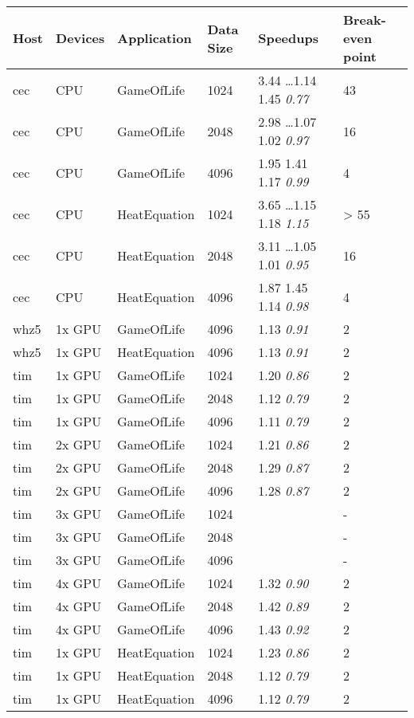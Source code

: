 \begin{tabular}{| l | l | l | l | l | l |}
\hline
\textbf{Host} & \textbf{Devices} & \textbf{Application} & \textbf{Data Size} & \textbf{Speedups} & \textbf{Break-even point}\\
\hline
cec & CPU & GameOfLife & 1024 & 3.44 \ldots 1.14 1.45 \textit{0.77} & 43 \\
cec & CPU & GameOfLife & 2048 & 2.98 \ldots 1.07 1.02 \textit{0.97} & 16 \\
cec & CPU & GameOfLife & 4096 & 1.95 1.41 1.17 \textit{0.99} & 4 \\
cec & CPU & HeatEquation & 1024 & 3.65 \ldots 1.15 1.18 \textit{1.15} & > 55 \\
cec & CPU & HeatEquation & 2048 & 3.11 \ldots 1.05 1.01 \textit{0.95} & 16 \\
cec & CPU & HeatEquation & 4096 & 1.87 1.45 1.14 \textit{0.98} & 4 \\
whz5 & 1x GPU & GameOfLife & 4096 & 1.13 \textit{0.91} & 2 \\
whz5 & 1x GPU & HeatEquation & 4096 & 1.13 \textit{0.91} & 2 \\
tim & 1x GPU & GameOfLife & 1024 & 1.20 \textit{0.86} & 2 \\
tim & 1x GPU & GameOfLife & 2048 & 1.12 \textit{0.79} & 2 \\
tim & 1x GPU & GameOfLife & 4096 & 1.11 \textit{0.79} & 2 \\
tim & 2x GPU & GameOfLife & 1024 & 1.21 \textit{0.86} & 2 \\
tim & 2x GPU & GameOfLife & 2048 & 1.29 \textit{0.87} & 2 \\
tim & 2x GPU & GameOfLife & 4096 & 1.28 \textit{0.87} & 2 \\
tim & 3x GPU & GameOfLife & 1024 &  & - \\
tim & 3x GPU & GameOfLife & 2048 &  & - \\
tim & 3x GPU & GameOfLife & 4096 &  & - \\
tim & 4x GPU & GameOfLife & 1024 & 1.32 \textit{0.90} & 2 \\
tim & 4x GPU & GameOfLife & 2048 & 1.42 \textit{0.89} & 2 \\
tim & 4x GPU & GameOfLife & 4096 & 1.43 \textit{0.92} & 2 \\
tim & 1x GPU & HeatEquation & 1024 & 1.23 \textit{0.86} & 2 \\
tim & 1x GPU & HeatEquation & 2048 & 1.12 \textit{0.79} & 2 \\
tim & 1x GPU & HeatEquation & 4096 & 1.12 \textit{0.79} & 2 \\

\end{tabular}
